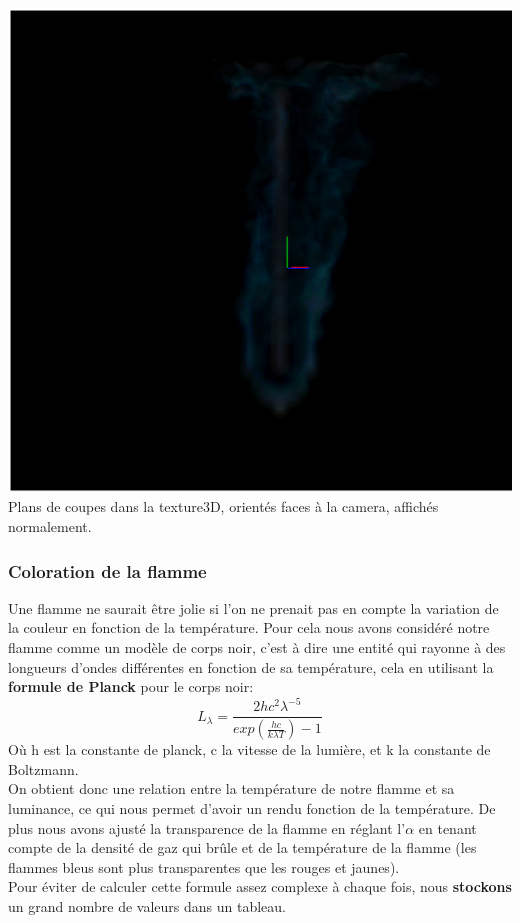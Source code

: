 \documentclass[a4paper,10pt]{article}
\begin{document}
\begin{center}
	\includegraphics[scale=0.3]{Render3D3.ps}\\
	Plans de coupes dans la texture3D, orientés faces à la camera, affichés normalement.\\
    \end{center}
    

\subsubsection{Coloration de la flamme}

Une flamme ne saurait être jolie si l'on ne prenait pas en compte la variation de la couleur en fonction de la température. Pour cela nous avons considéré notre flamme comme un modèle de corps noir, c'est à dire une entité qui rayonne à des longueurs d'ondes différentes en fonction de sa température, cela en utilisant la \textbf{formule de Planck} pour le corps noir:\\

\begin{equation}
	L_{\lambda} = \frac{2hc^{2}\lambda^{-5}}{exp(\frac{hc}{k\lambda T})-1}
\end{equation}
Où h est la constante de planck, c la vitesse de la lumière, et k la constante de Boltzmann.\\

On obtient donc une relation entre la température de notre flamme et sa luminance, ce qui nous permet d'avoir un rendu fonction de la température. De plus nous avons ajusté la transparence de la flamme en réglant l'$\alpha$ en tenant compte de la densité de gaz qui brûle et de la température de la flamme (les flammes bleus sont plus transparentes que les rouges et jaunes).\\
Pour éviter de calculer cette formule assez complexe à chaque fois, nous \textbf{stockons} un grand nombre de valeurs dans un tableau.
\end{document}
